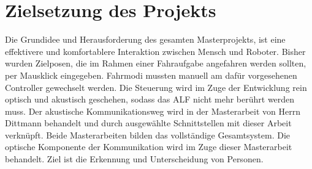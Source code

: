 	\section{Zielsetzung des Projekts}
		Die Grundidee und Herausforderung des gesamten Masterprojekts, ist eine effektivere und komfortablere Interaktion zwischen Mensch und Roboter. Bisher wurden Zielposen, die im Rahmen einer Fahraufgabe angefahren werden sollten, per Mausklick eingegeben. Fahrmodi mussten manuell am dafür vorgesehenen Controller gewechselt werden. Die Steuerung wird im Zuge der Entwicklung rein optisch und akustisch geschehen, sodass das ALF nicht mehr berührt werden muss. Der akustische Kommunikationsweg wird in der Masterarbeit von Herrn Dittmann behandelt und durch ausgewählte Schnittstellen mit dieser Arbeit verknüpft. Beide Masterarbeiten bilden das vollständige Gesamtsystem. Die optische Komponente der Kommunikation wird im Zuge dieser Masterarbeit behandelt. Ziel ist die Erkennung und Unterscheidung von Personen. \\
		
		
	